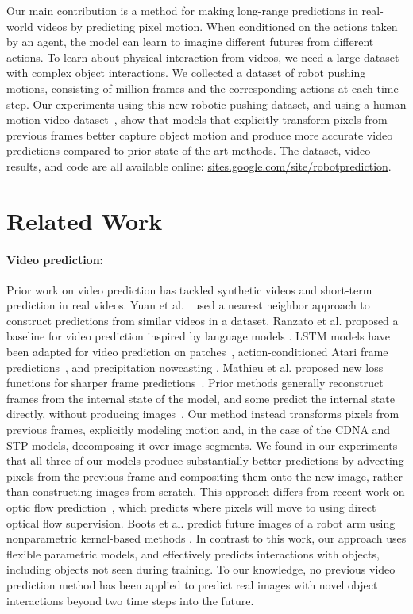 \documentclass{article}
\begin{document}
Our main contribution is a method for making long-range predictions in real-world videos
by predicting pixel motion. When conditioned on the actions
taken by an agent, the model can learn to imagine different futures from different actions.
To learn about physical interaction from videos, we need a large dataset with complex object interactions.
We collected a dataset of  robot pushing motions, consisting of  million frames
and the corresponding actions at each time step.
Our experiments using this new robotic pushing dataset, and using a human motion video dataset~\cite{ipos-h36m-14},
show that models that explicitly
transform pixels from previous frames better capture object motion and produce more accurate video predictions compared to prior state-of-the-art methods.
The dataset, video results, and code are all available online: \url{sites.google.com/site/robotprediction}.

\section{Related Work}
\label{related}





\vspace{-0.07in}
\paragraph{Video prediction:} Prior work on video prediction has tackled synthetic videos and short-term prediction in real videos. Yuan et al.~\cite{Yuen2010} used a
nearest neighbor approach to construct predictions from similar videos in a dataset.
Ranzato et al. proposed a baseline for video prediction inspired by language models \cite{vlmb-rsbmcc-14}.
LSTM models have been adapted for video prediction on patches~\cite{ulvr-sms-15}, action-conditioned Atari frame predictions~\cite{acvpa-oglls-15}, and precipitation
nowcasting \cite{xcwyw-clstm-15}.
Mathieu et al. proposed new loss functions for sharper frame predictions~\cite{vpbmse-mcl-16}.
Prior methods generally reconstruct frames from the internal state of the model, and some predict the internal state directly, without producing images~\cite{vpt-afwuv-15}.
Our method instead transforms pixels from previous frames, explicitly modeling motion and, in the case of the CDNA and STP models, decomposing it over image segments.
We found in our experiments that all three of our models produce substantially better predictions by advecting pixels from the previous frame and compositing them onto
the new image, rather than constructing images from scratch.
This approach differs from recent work on optic flow prediction~\cite{wdgh-auf-16}, which predicts where pixels will move to using direct optical flow supervision.
Boots et al. predict future images of a robot arm using nonparametric kernel-based methods \cite{bbf-lpmdc-14}.
In contrast to this work, our approach uses flexible parametric models,
and effectively predicts interactions with objects, including objects not seen during training. To our knowledge, no previous video prediction method has been applied to predict real images with novel object interactions beyond two time steps into the future.
\end{document}
